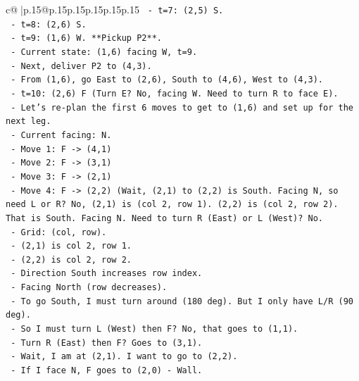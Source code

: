 \documentclass{article}
\begin{document}
{\begin{supertabular}{c@{$\;$}|p{.15\linewidth}@{}p{.15\linewidth}p{.15\linewidth}p{.15\linewidth}p{.15\linewidth}p{.15\linewidth}}
{{{\texttt{              {-} t=7: (2,5) S.} \\
\texttt{              {-} t=8: (2,6) S.} \\
\texttt{              {-} t=9: (1,6) W. **Pickup P2**.} \\
\texttt{              {-} Current state: (1,6) facing W, t=9.} \\
\texttt{              {-} Next, deliver P2 to (4,3).} \\
\texttt{              {-} From (1,6), go East to (2,6), South to (4,6), West to (4,3).} \\
\texttt{              {-} t=10: (2,6) F (Turn E? No, facing W. Need to turn R to face E).} \\
\texttt{              {-} Let's re{-}plan the first 6 moves to get to (1,6) and set up for the next leg.} \\
\texttt{              {-} Current facing: N.} \\
\texttt{              {-} Move 1: F {-}> (4,1)} \\
\texttt{              {-} Move 2: F {-}> (3,1)} \\
\texttt{              {-} Move 3: F {-}> (2,1)} \\
\texttt{              {-} Move 4: F {-}> (2,2) (Wait, (2,1) to (2,2) is South. Facing N, so need L or R? No, (2,1) is (col 2, row 1). (2,2) is (col 2, row 2). That is South. Facing N. Need to turn R (East) or L (West)? No.} \\
\texttt{                {-} Grid: (col, row).} \\
\texttt{                {-} (2,1) is col 2, row 1.} \\
\texttt{                {-} (2,2) is col 2, row 2.} \\
\texttt{                {-} Direction South increases row index.} \\
\texttt{                {-} Facing North (row decreases).} \\
\texttt{                {-} To go South, I must turn around (180 deg). But I only have L/R (90 deg).} \\
\texttt{                {-} So I must turn L (West) then F? No, that goes to (1,1).} \\
\texttt{                {-} Turn R (East) then F? Goes to (3,1).} \\
\texttt{                {-} Wait, I am at (2,1). I want to go to (2,2).} \\
\texttt{                {-} If I face N, F goes to (2,0) {-} Wall.} \\
}}}
\end{supertabular}}
\end{document}
